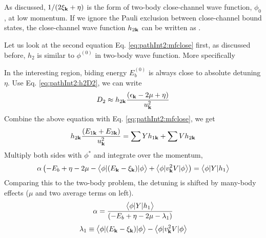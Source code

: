 As discussed, $1/(2\xi_{\mathbf{k}}+\eta)$ is the form of two-body close-channel wave function, $\phi_0$, at low momentum.  If we ignore the Pauli exclusion between close-channel bound states, the close-channel wave function $h_{2\mathbf{k}}$ can be written as .

Let us look at the second equation Eq. \ref{eq:pathInt2:mfclose} first, as discussed before, $h_{2}$ is similar to $\phi^{(0)}$ in two-body wave function. More specifically

In the interesting region, biding energy $E_{b}^{(0)}$ is always close to absolute detuning $\eta$.   
Use Eq. \ref{eq:pathInt2:h2D2}, we can write 
\begin{equation*}
D_{2}\approx{}h_{2\mathbf{k}}\frac{(\epsilon_{\mathbf{k}}-2\mu+\eta)}{u_{\mathbf{k}}^{2}}
\end{equation*}
Combine the above equation with Eq. \ref{eq:pathInt2:mfclose}, we get 
\begin{equation*}
h_{2\mathbf{k}}\frac{(E_{1\mathbf{k}}+E_{3\mathbf{k}})}{u_{\mathbf{k}}^{2}}=\sum{}Yh_{1\mathbf{k}}+\sum{}Vh_{2\mathbf{k}}
\end{equation*}
Multiply both sides with $\phi^{*}$ and integrate over the momentum,
\begin{equation}
\alpha\left(-E_{b}+\eta-2\mu-\bigl<{\phi{\lvert{(E_{\ensuremath{\mathbf{k}}}-\xi_{\ensuremath{\mathbf{k}}})}\rvert}\phi}\bigr>+\bigl<{\phi{\lvert{v_{\ensuremath{\mathbf{k}}}^{2}V}\rvert}\phi}\bigr>\right)=\bigl<{\phi{\lvert{Y}\rvert}h_{1}}\bigr>
\end{equation}
Comparing this to the two-body problem, the detuning is shifted by many-body effects ($\mu$ and two average terms on left).  
\begin{equation}\label{eq:pathInt2:alpha}
\alpha=\frac{\bigl<{\phi{\lvert{Y}\rvert}h_{1}}\bigr>}{\left(-E_{b}+\eta-2\mu-\lambda_{1}\right)}
\end{equation}
\begin{equation}\label{eq:pathInt2:lambda1}
\lambda_{1}\equiv\bigl<{\phi{\lvert{(E_{\ensuremath{\mathbf{k}}}-\xi_{\ensuremath{\mathbf{k}}})}\rvert}\phi}\bigr>-\bigl<{\phi{\lvert{v_{\ensuremath{\mathbf{k}}}^{2}V}\rvert}\phi}\bigr>
\end{equation}


